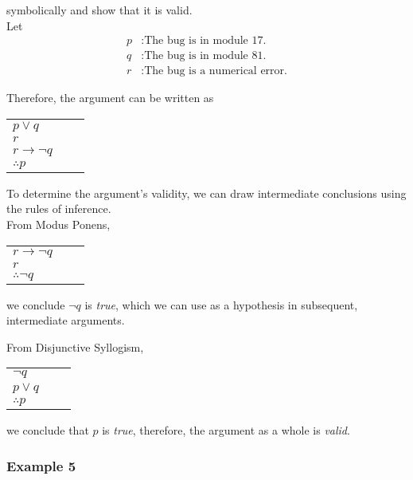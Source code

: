symbolically and show that it is valid.\\

Let 
\begin{align*}
p&: \text{The bug is in module 17.}\\
q&: \text{The bug is in module 81.}\\
r&: \text{The bug is a numerical error.}
\end{align*}

Therefore, the argument can be written as 

\begin{table}[h]
\centering
\begin{tabular}{l@{\,}l@{\,}l@{\,}}
$p \vee q$ & & \\
$r$ & & \\
$r \rightarrow \lnot q$ & & \\
\hline
$\therefore p$ & &
\end{tabular}
\end{table}

To determine the argument's validity, we can draw intermediate conclusions using the rules of inference.\\


From Modus Ponens,

\begin{table}[h]
\centering
\begin{tabular}{l@{\,}l@{\,}l@{\,}}
$r \rightarrow \lnot q$ & & \\
$r$ & & \\
\hline
$\therefore \lnot q$ & &
\end{tabular}
\end{table}

we conclude $\lnot q$ is \textit{true}, which we can use as a hypothesis in subsequent, intermediate arguments.

\clearpage

From Disjunctive Syllogism,

\begin{table}[h]
\centering
\begin{tabular}{l@{\,}l@{\,}l@{\,}}
$\lnot q$ & & \\
$p \vee q$ & & \\
\hline
$\therefore p$ & &
\end{tabular}
\end{table}

we conclude that $p$ is \textit{true}, therefore, the argument as a whole is \textit{valid}.

\subsubsection{Example 5}

